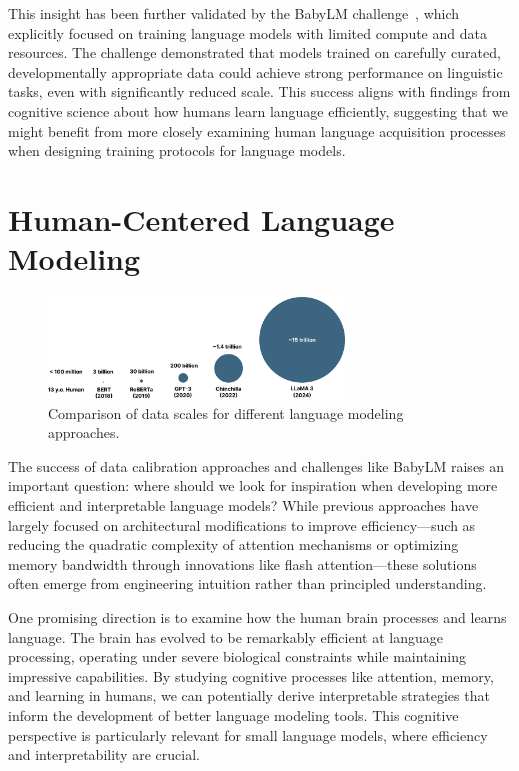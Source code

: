 This insight has been further validated by the BabyLM challenge~\citep{warstadt2023babylm1,conll2024babylm2}, which explicitly focused on training language models with limited compute and data resources. The challenge demonstrated that models trained on carefully curated, developmentally appropriate data could achieve strong performance on linguistic tasks, even with significantly reduced scale. This success aligns with findings from cognitive science about how humans learn language efficiently, suggesting that we might benefit from more closely examining human language acquisition processes when designing training protocols for language models.

\section{Human-Centered Language Modeling}


\begin{figure}[h]
    \centering
    \includegraphics[width=0.7\textwidth]{chapters/background/figures/data_comparison.pdf}
    \caption{Comparison of data scales for different language modeling approaches.}
    \label{fig:data-comparison}
\end{figure}

The success of data calibration approaches and challenges like BabyLM raises an important question: where should we look for inspiration when developing more efficient and interpretable language models? While previous approaches have largely focused on architectural modifications to improve efficiency—such as reducing the quadratic complexity of attention mechanisms or optimizing memory bandwidth through innovations like flash attention—these solutions often emerge from engineering intuition rather than principled understanding.

One promising direction is to examine how the human brain processes and learns language. The brain has evolved to be remarkably efficient at language processing, operating under severe biological constraints while maintaining impressive capabilities. By studying cognitive processes like attention, memory, and learning in humans, we can potentially derive interpretable strategies that inform the development of better language modeling tools. This cognitive perspective is particularly relevant for small language models, where efficiency and interpretability are crucial.

